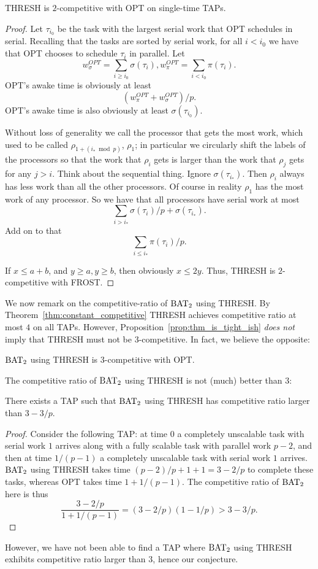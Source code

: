 \begin{proposition}
THRESH is $2$-competitive with OPT on single-time TAPs.
\end{proposition}
\begin{proof}
Let $\tau_{i_0}$ be the task with the largest serial work that
OPT schedules in serial. Recalling that the tasks are sorted by
serial work, for all $i < i_0$ we have that OPT chooses to
schedule $\tau_i$ in parallel. Let $$w^{OPT}_\sigma = \sum_{i \ge
i_0} \sigma(\tau_i), w^{OPT}_\pi = \sum_{i < i_0} \pi(\tau_i).$$
OPT's awake time is obviously at least $$(w^{OPT}_\pi +
w^{OPT}_\sigma)/p.$$ OPT's awake time is also obviously at least
$\sigma(\tau_{i_0})$.

Without loss of generality we call the processor that gets the
most work, which used to be called $\rho_{1+(i_* \bmod p)}$,
$\rho_1$; in particular we circularly shift the labels of the
processors so that the work that $\rho_i$ gets is larger than the
work that $\rho_j$ gets for any $j > i$.
Think about the sequential thing.
Ignore $\sigma(\tau_{i_*})$. Then $\rho_i$ always has less work
than all the other processors. Of course in reality $\rho_1$ has
the most work of any processor.
So we have that all processors have serial work at most 
$$\sum_{i > i_*} \sigma(\tau_i)/p + \sigma(\tau_{i_*}).$$
Add on to that $$\sum_{i \le i_*} \pi(\tau_i)/p.$$

If $x \le a + b$, and $y \ge a, y \ge b$, then obviously $x \le
2y$. Thus, THRESH is $2$-competitive with FROST. 
\end{proof}

We now remark on the competitive-ratio of $\operatorname{\text{BAT}}_2$ using THRESH.
By Theorem~\ref{thm:constant_competitive} THRESH achieves
competitive ratio at most $4$ on all TAPs. However,
Proposition~\ref{prop:thm_is_tight_ish} \emph{does not} imply
that THRESH must not be $3$-competitive. In fact, we believe the
opposite:
\begin{conjecture}
  $\operatorname{\text{BAT}}_2$ using THRESH is $3$-competitive with OPT.
\end{conjecture}

The competitive ratio of $\operatorname{\text{BAT}}_2$ using THRESH is not (much) better than $3$:
\begin{proposition}
  There exists a TAP such that $\operatorname{\text{BAT}}_2$ using THRESH has
  competitive ratio larger than $3-3/p$.
\end{proposition}
\begin{proof}
  Consider the following TAP: at time $0$ a completely unscalable
  task with serial work $1$ arrives along with a fully scalable
  task with parallel work $p-2$, and then at time $1/(p-1)$ a
  completely unscalable task with serial work $1$ arrives.
  $\operatorname{\text{BAT}}_2$ using THRESH takes time $(p-2)/p + 1 + 1 = 3-2/p$ to
  complete these tasks, whereas OPT takes time $1+1/(p-1)$.
  The competitive ratio of $\operatorname{\text{BAT}}_2$ here is thus
  $$\frac{3-2/p}{1+1/(p-1)} = (3-2/p)(1-1/p) > 3-3/p.$$
\end{proof}
However, we have not been able to find a TAP where $\operatorname{\text{BAT}}_2$ using
THRESH exhibits competitive ratio larger than $3$, hence our
conjecture. 

